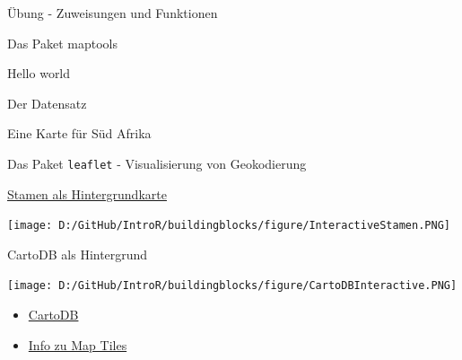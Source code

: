 \documentclass[ignorenonframetext,]{beamer}
\newenvironment{Shaded}{\begin{snugshade}}{\end{snugshade}}
\newcommand{\DataTypeTok}[1]{\textcolor[rgb]{0.74,0.68,0.62}{\underline{#1}}}
\newcommand{\FloatTok}[1]{\textcolor[rgb]{0.27,0.67,0.26}{#1}}
\newcommand{\KeywordTok}[1]{\textcolor[rgb]{0.26,0.66,0.93}{\textbf{#1}}}
\newcommand{\NormalTok}[1]{\textcolor[rgb]{0.74,0.68,0.62}{#1}}
\newcommand{\OperatorTok}[1]{\textcolor[rgb]{0.74,0.68,0.62}{#1}}
\newcommand{\StringTok}[1]{\textcolor[rgb]{0.02,0.61,0.04}{#1}}
\begin{document}
\begin{frame}[fragile]{Übung - Zuweisungen und Funktionen}
\begin{frame}[fragile]{Das Paket maptools}
\begin{frame}[fragile]{Hello world}
\begin{frame}[fragile]{Der Datensatz}
\begin{frame}[fragile]{Eine Karte für Süd Afrika}
\begin{frame}[fragile]{Das Paket \texttt{leaflet} - Visualisierung von
Geokodierung}
\begin{Shaded}
\end{Shaded}

\end{frame}

\begin{frame}[fragile]{\href{https://rstudio.github.io/leaflet/basemaps.html}{Stamen
als Hintergrundkarte}}
\protect\hypertarget{stamen-als-hintergrundkarte}{}

\begin{Shaded}
\end{Shaded}

\texttt{[image: D:/GitHub/IntroR/buildingblocks/figure/InteractiveStamen.PNG]}

\end{frame}

\begin{frame}[fragile]{CartoDB als Hintergrund}
\protect\hypertarget{cartodb-als-hintergrund}{}

\begin{Shaded}
\end{Shaded}

\texttt{[image: D:/GitHub/IntroR/buildingblocks/figure/CartoDBInteractive.PNG]}

\begin{itemize}
\item
  \href{https://carto.com/attribution}{CartoDB}
\item
  \href{https://www.mapbox.com/help/how-web-maps-work/}{Info zu Map
  Tiles}
\end{itemize}


\end{frame}
\end{frame}
\end{frame}
\end{frame}
\end{frame}
\end{frame}
\end{document}
